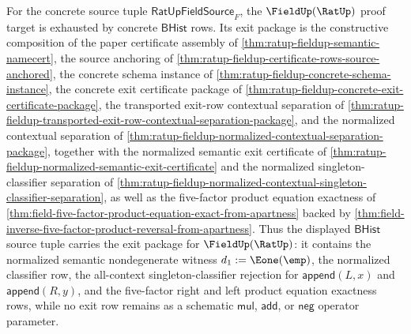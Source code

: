 \begin{theorem}
\label{thm:ratup-fieldup-proof-target-exit-package}
For the concrete source tuple $\mathsf{RatUpFieldSource}_F$, the
$\FieldUp(\RatUp)$ proof target is exhausted by concrete $\mathsf{BHist}$ rows.
Its exit package is the constructive composition of the paper certificate
assembly of \autoref{thm:ratup-fieldup-semantic-namecert}, the source anchoring
of \autoref{thm:ratup-fieldup-certificate-rows-source-anchored}, the concrete
schema instance of \autoref{thm:ratup-fieldup-concrete-schema-instance}, the
concrete exit certificate package of
\autoref{thm:ratup-fieldup-concrete-exit-certificate-package}, the transported
exit-row contextual separation of
\autoref{thm:ratup-fieldup-transported-exit-row-contextual-separation-package},
and the normalized contextual separation of
\autoref{thm:ratup-fieldup-normalized-contextual-separation-package}, together
with the normalized semantic exit certificate of
\autoref{thm:ratup-fieldup-normalized-semantic-exit-certificate} and the
normalized singleton-classifier separation of
\autoref{thm:ratup-fieldup-normalized-contextual-singleton-classifier-separation},
as well as the five-factor product equation exactness of
\autoref{thm:field-five-factor-product-equation-exact-from-apartness} backed by
\autoref{thm:field-inverse-five-factor-product-reversal-from-apartness}.
Thus the displayed $\mathsf{BHist}$ source tuple carries the exit package for
$\FieldUp(\RatUp)$: it contains the normalized semantic nondegenerate witness
$d_1:=\Eone(\emp)$, the normalized classifier row, the all-context
singleton-classifier rejection for $\mathsf{append}(L,x)$ and
$\mathsf{append}(R,y)$, and the five-factor right and left product equation
exactness rows, while no exit row remains as a schematic
$\mathsf{mul}$, $\mathsf{add}$, or $\mathsf{neg}$ operator parameter.
\end{theorem}
